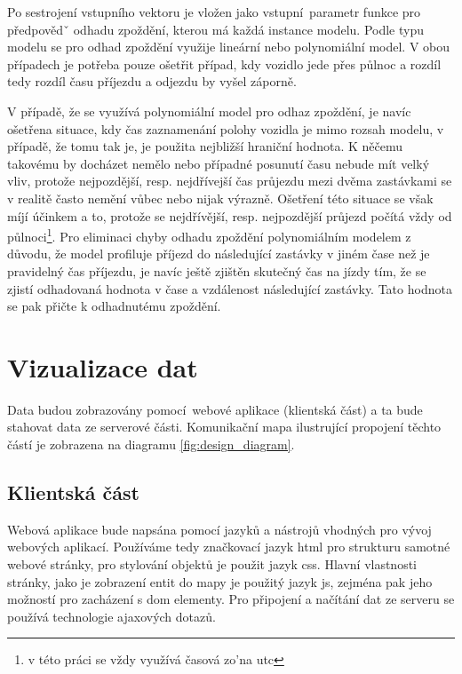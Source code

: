 Po sestrojení vstupního vektoru je vložen jako vstupní parametr funkce pro předpovědˇ odhadu zpoždění, kterou má každá instance modelu. Podle typu modelu se pro odhad zpoždění využije lineární nebo polynomiální model. V obou případech je potřeba pouze ošetřit případ, kdy vozidlo jede přes půlnoc a rozdíl tedy rozdíl času příjezdu a odjezdu by vyšel záporně.

V případě, že se využívá polynomiální model pro odhaz zpoždění, je navíc ošetřena situace, kdy čas zaznamenání polohy vozidla je mimo rozsah modelu, v případě, že tomu tak je, je použita nejbližší hraniční hodnota. K něčemu takovému by docházet nemělo nebo případné posunutí času nebude mít velký vliv, protože nejpozdější, resp. nejdřívejší čas průjezdu mezi dvěma zastávkami se v realitě často nemění vůbec nebo nijak výrazně. Ošetření této situace se však míjí účinkem a to, protože se nejdřívější, resp. nejpozdější průjezd počítá vždy od půlnoci\footnote{v této práci se vždy využívá časová zo'na \gls{utc}}. Pro eliminaci chyby odhadu zpoždění polynomiálním modelem z důvodu, že model profiluje příjezd do následující zastávky v jiném čase než je pravidelný čas příjezdu, je navíc ještě zjištěn skutečný čas na jízdy tím, že se zjistí odhadovaná hodnota v čase a vzdálenost následující zastávky. Tato hodnota se pak přičte k odhadnutému zpoždění.

\section{Vizualizace dat}

Data budou zobrazovány pomocí webové aplikace (klientská část) a ta bude stahovat data ze serverové části. Komunikační mapa ilustrující propojení těchto částí je zobrazena na diagramu \ref{fig:design_diagram}.

\subsection{Klientská část}

Webová aplikace bude napsána pomocí jazyků a nástrojů vhodných pro vývoj webových aplikací. Používáme tedy značkovací jazyk \gls{html} pro strukturu samotné webové stránky, pro stylování objektů je použit jazyk \gls{css}. Hlavní vlastnosti stránky, jako je zobrazení entit do mapy je použitý jazyk \gls{js}, zejména pak jeho možností pro zacházení s \gls{dom} elementy. Pro připojení a načítání dat ze serveru se používá technologie \gls{ajax}ových dotazů.

